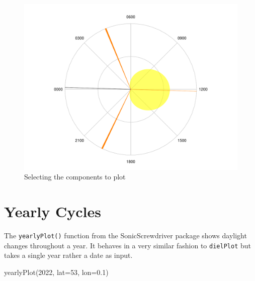 \documentclass[
]{book}
\newenvironment{Shaded}{\begin{snugshade}}{\end{snugshade}}
\newcommand{\AttributeTok}[1]{\textcolor[rgb]{0.77,0.63,0.00}{#1}}
\newcommand{\DecValTok}[1]{\textcolor[rgb]{0.00,0.00,0.81}{#1}}
\newcommand{\FloatTok}[1]{\textcolor[rgb]{0.00,0.00,0.81}{#1}}
\newcommand{\FunctionTok}[1]{\textcolor[rgb]{0.00,0.00,0.00}{#1}}
\newcommand{\NormalTok}[1]{#1}
\begin{document}
\begin{figure}

{\centering \includegraphics[width=0.9\linewidth]{_main_files/figure-latex/diel-plot-components-1} 

}

\caption{Selecting the components to plot}\label{fig:diel-plot-components}
\end{figure}

\hypertarget{yearly-cycles}{%
\section{Yearly Cycles}\label{yearly-cycles}}

The \texttt{yearlyPlot()} function from the SonicScrewdriver package shows daylight changes throughout a year. It behaves in a very similar fashion to \texttt{dielPlot} but takes a single year rather a date as input.

\begin{Shaded}
\begin{Highlighting}[]
\FunctionTok{yearlyPlot}\NormalTok{(}\DecValTok{2022}\NormalTok{, }\AttributeTok{lat=}\DecValTok{53}\NormalTok{, }\AttributeTok{lon=}\FloatTok{0.1}\NormalTok{)}
\end{Highlighting}
\end{Shaded}
\end{document}
